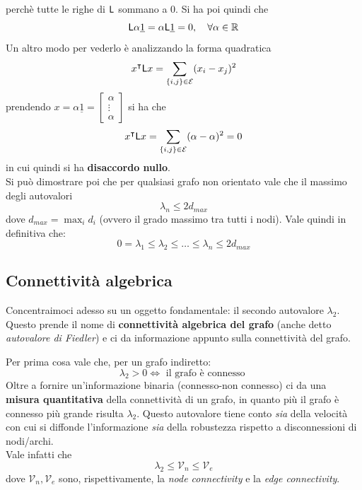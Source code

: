 perch\`e tutte le righe di $\mathsf{L}$ sommano a 0. Si ha poi quindi che
\begin{equation}
\mathsf{L} \alpha \underline{1} = \alpha \mathsf{L} \underline{1} = 0, \quad \forall \alpha \in \mathbb{R}
\end{equation}
Un altro modo per vederlo \`e analizzando la forma quadratica
\begin{equation}
x^\intercal \mathsf{L} x = \sum_{\{i,j\} \in \mathcal{E}} (x_i - x_j)^2
\end{equation}
prendendo $x = \alpha \underline{1} = \begin{bmatrix} \alpha \\ \vdots \\ \alpha \end{bmatrix}$ si ha che
\begin{equation}
x^\intercal \mathsf{L} x = \sum_{\{i,j\} \in \mathcal{E}} (\alpha - \alpha)^2 = 0
\end{equation}
in cui quindi si ha \textbf{disaccordo nullo}.\\
Si pu\`o dimostrare poi che per qualsiasi grafo non orientato vale che il massimo degli autovalori 
\begin{equation}
    \lambda_n \leq 2 d_{max}
\end{equation} dove $d_{max} = \max_{i} d_i$ (ovvero il grado massimo tra tutti i nodi). 
Vale quindi in definitiva che:
\begin{equation}
0 = \lambda_1 \leq \lambda_2 \leq \dots \leq \lambda_n \leq 2 d_{max}
\end{equation}

\subsection{Connettivit\`a algebrica}

Concentraimoci adesso su un oggetto fondamentale: il secondo autovalore $\lambda_2$. Questo prende il nome di \textbf{connettivit\`a algebrica del grafo} (anche detto \textit{autovalore di Fiedler}) e ci da informazione appunto sulla connettivit\`a del grafo. 

Per prima cosa vale che, per un grafo indiretto:
\begin{equation}
\lambda_2 > 0 \iff \text{ il grafo \`e connesso }
\end{equation}
Oltre a fornire un'informazione binaria (connesso-non connesso) ci da una \textbf{misura quantitativa} della connettivit\`a di un grafo, in quanto pi\`u il grafo \`e connesso pi\`u grande risulta $\lambda_2$. Questo autovalore tiene conto \textit{sia} della velocit\`a con cui si diffonde l'informazione \textit{sia} della robustezza rispetto a disconnessioni di nodi/archi.\\
Vale infatti che 
\begin{equation}
\lambda_2 \leq \mathcal{V}_n \leq \mathcal{V}_e
\end{equation}
dove $\mathcal{V}_n, \mathcal{V}_e$ sono, rispettivamente, la \textit{node connectivity} e la \textit{edge connectivity}.

